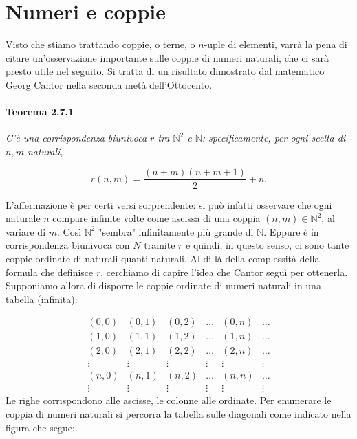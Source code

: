 \section{Numeri e coppie}

Visto che stiamo trattando coppie, o terne, o $n$-uple di elementi, varrà la pena
di citare un'osservazione importante sulle coppie di numeri naturali, che ci sarà
presto utile nel seguito. Si tratta di un risultato dimostrato dal matematico
Georg Cantor nella seconda metà dell'Ottocento.

\paragraph{Teorema 2.7.1}
\textit{C'è una corrispondenza biunivoca $r$ tra ${\mathbb{N}}^2$ e $\mathbb{N}$:
    specificamente, per ogni scelta di $n,m$ naturali,}

\[
    r(n,m) = \frac{(n+m)(n+m+1)}{2} + n.
\]

L'affermazione è per certi versi sorprendente: si può infatti osservare che ogni
naturale $n$ compare infinite volte come ascissa di una coppia $(n, m) \in
    \mathbb{N}^2$, al variare di $m$. Così $\mathbb{N}^2$ "sembra" infinitamente più grande
di $\mathbb{N}$. Eppure è in corrispondenza biunivoca con $N$ tramite $r$ e quindi,
in questo senso, ci sono tante coppie ordinate di naturali quanti naturali. Al di là
della complessità della formula che definisce $r$, cerchiamo di capire l'idea che
Cantor seguì per ottenerla. Supponiamo allora di disporre le coppie ordinate di
numeri naturali in una tabella (infinita):

$$
    \begin{array}{cccccc}
        (0,0)  & (0,1)  &
        (0,2)  & \ldots & (0, n) & \ldots                   \\ (1,0) & (1,1) & (1,2) & \ldots & (1, n) & \ldots
        \\ (2,0) & (2,1) & (2,2) & \ldots & (2, n) & \ldots \\ \vdots & \vdots & \vdots &
        \vdots & \vdots & \vdots                            \\ (n, 0) & (n, 1) & (n, 2) & \ldots & (n, n) & \ldots \\
        \vdots & \vdots & \vdots & \vdots & \vdots & \vdots
    \end{array}
$$
Le righe
corrispondono alle ascisse, le colonne alle ordinate. Per enumerare le coppia di
numeri naturali si percorra la tabella sulle diagonali come indicato nella figura che
segue:

